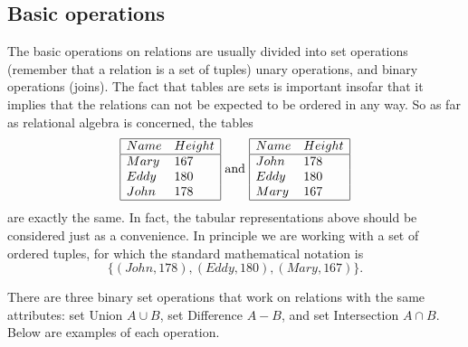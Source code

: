 \subsection{Basic operations}
The basic operations on relations are usually divided into set operations
(remember that a relation is a set of tuples) unary operations, and binary
operations (joins).  The fact that tables are sets is important insofar that it
implies that the relations can not be expected to be ordered in any way. So as
far as relational algebra is concerned, the tables
$$
\begin{array}{|ll|}
\hline
Name & Height\\
\hline
Mary & 167\\
Eddy & 180\\
John & 178\\
\hline
\end{array}
\textrm{ and }
\begin{array}{|ll|}
\hline
Name & Height\\
\hline
John & 178\\
Eddy & 180\\
Mary & 167\\
\hline
\end{array}
$$
are exactly the same. In fact, the tabular representations above should be considered
just as a convenience. In principle we are working with a set of ordered tuples, for
which the standard mathematical notation is
$$
\{(John, 178), (Eddy,180), (Mary, 167)\}.
$$

There are three binary set operations that work on relations with the same
attributes: set Union $A\cup B$, set Difference $A-B$, and set Intersection
$A\cap B$. Below are examples of each operation.

